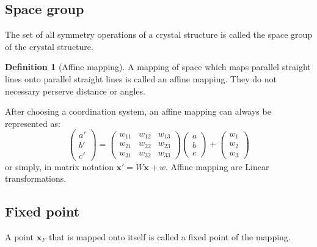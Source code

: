 \documentclass{amsart}
\newcommand{\bfx}{\mathbf{x}}
\theoremstyle{remark}
\theoremstyle{remark}
\theoremstyle{definition}
\newtheorem*{definition}{Definition}
\begin{document}
\subsection*{Space group}
The set of all symmetry operations of a crystal structure is called the space group of the crystal structure.

\vspace{10pt}

\begin{definition}
    [Affine mapping]
    A mapping of space which maps parallel straight lines onto parallel straight lines is called an affine mapping. They do not necessary perserve 
    distance or angles.
\end{definition}

After choosing a coordination system, an affine mapping can always be represented as:
\begin{equation*}
    \left( \begin{matrix}
        a'\\b'\\c'
    \end{matrix} \right)  = \left( \begin{matrix}
        w_{11} & w_{12} & w_{13} \\
        w_{21} & w_{22} & w_{23} \\
        w_{31} & w_{32} & w_{33}
    \end{matrix} \right) \left( \begin{matrix}
        a\\b\\c
    \end{matrix} \right)+ \left( \begin{matrix}
        w_1\\w_2\\w_3
    \end{matrix} \right)
\end{equation*}
or simply, in matrix notation $\bfx' = W\bfx + w$. Affine mapping are Linear transformations.

\subsection*{Fixed point} A point $\bfx_F$ that is mapped onto itself is called a fixed point of the mapping.

\vspace{10pt}
\end{document}
